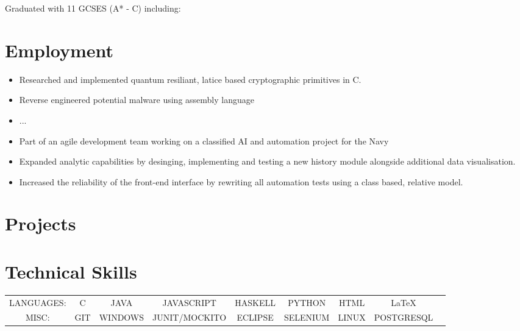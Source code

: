 \documentclass{cvclass}
\begin{document}
Graduated with 11 GCSES (A* - C) including:\newline


\section{Employment}
\begin{itemize}
\itemsep0em 
\item Researched and implemented quantum resiliant, latice based cryptographic primitives in C.
\item Reverse engineered potential malware using assembly language
\item ...
\end{itemize}


\par
\begin{itemize}
\itemsep0em 
\item Part of an agile development team working on a classified AI and automation project for the Navy
\item Expanded analytic capabilities by desinging, implementing and testing a new history module alongside additional data visualisation.
\item Increased the reliability of the front-end interface by rewriting all automation tests using a class based, relative model.
\end{itemize}

\section{Projects}

\section{Technical Skills}
\begin{tabular}{ c c c c c c c c c }
  LANGUAGES: & C & JAVA & JAVASCRIPT & HASKELL & PYTHON & HTML & \LaTeX\\
  MISC: & GIT & WINDOWS & JUNIT/MOCKITO & ECLIPSE & SELENIUM & LINUX & POSTGRESQL
\end{tabular}\newline
\end{document}

